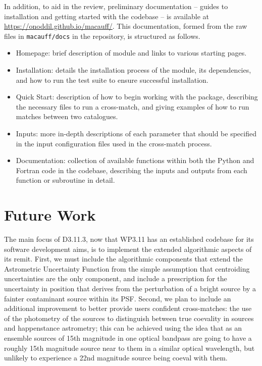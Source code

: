 \documentclass[a4paper,11pt]{scrartcl}
\begin{document}
In addition, to aid in the review, preliminary documentation -- guides to installation and getting started with the codebase -- is available at \href{https://onoddil.github.io/macauff/}{https://onoddil.github.io/macauff/}.
This documentation, formed from the raw files in \texttt{macauff/docs} in the repository, is structured as follows.

\begin{itemize}
	\item Homepage: brief description of module and links to various starting pages.
	\item Installation: details the installation process of the module, its dependencies, and how to run the test suite to ensure successful installation.
	\item Quick Start: description of how to begin working with the package, describing the necessary files to run a cross-match, and giving examples of how to run matches between two catalogues.
	\item Inputs: more in-depth descriptions of each parameter that should be specified in the input configuration files used in the cross-match process.
	\item Documentation: collection of available functions within both the Python and Fortran code in the codebase, describing the inputs and outputs from each function or subroutine in detail.
\end{itemize}

\section{Future Work}
The main focus of D3.11.3, now that WP3.11 has an established codebase for its software development aims, is to implement the extended algorithmic aspects of its remit.
First, we must include the algorithmic components that extend the Astrometric Uncertainty Function from the simple assumption that centroiding uncertainties are the only component, and include a prescription for the uncertainty in position that derives from the perturbation of a bright source by a fainter contaminant source within its PSF.
Second, we plan to include an additional improvement to better provide users confident cross-matches: the use of the photometry of the sources to distinguish between true coevality in sources and happenstance astrometry; this can be achieved using the idea that as an ensemble sources of 15th magnitude in one optical bandpass are going to have a roughly 15th magnitude source near to them in a similar optical wavelength, but unlikely to experience a 22nd magnitude source being coeval with them.
\end{document}

